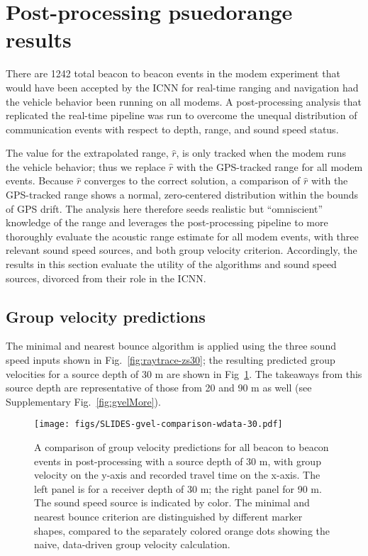 \FloatBarrier
\section{\label{sec:5} Post-processing psuedorange results}

There are 1242 total beacon to beacon events in the modem experiment that would have been accepted by the ICNN for real-time ranging and navigation had the vehicle behavior been running on all modems.
A post-processing analysis that replicated the real-time pipeline was run to overcome the unequal distribution of communication events with respect to depth, range, and sound speed status.

The value for the extrapolated range, $\hat{r}$, is only tracked when the modem runs the vehicle behavior; thus we replace $\hat{r}$ with the GPS-tracked range for all modem events.
Because $\hat{r}$ converges to the correct solution, a comparison of $\hat{r}$ with the GPS-tracked range shows a normal, zero-centered distribution within the bounds of GPS drift.
The analysis here therefore seeds realistic but ``omniscient'' knowledge of the range and leverages the post-processing pipeline to more thoroughly evaluate the acoustic range estimate for all modem events, with three relevant sound speed sources, and both group velocity criterion.
Accordingly, the results in this section evaluate the utility of the algorithms and sound speed sources, divorced from their role in the ICNN.

\FloatBarrier
\subsection{Group velocity predictions}

The minimal and nearest bounce algorithm is applied using the three sound speed inputs shown in Fig.~\ref{fig:raytrace-zs30}; the resulting predicted group velocities for a source depth of 30 m are shown in Fig~\ref{fig:gvel30}.
The takeaways from this source depth are representative of those from 20 and 90 m as well (see Supplementary Fig.~\ref{fig:gvelMore}).

\begin{figure}[h!]
\texttt{[image: figs/SLIDES-gvel-comparison-wdata-30.pdf]}
\caption{A comparison of group velocity predictions for all beacon to beacon events in post-processing with a source depth of 30 m, with group velocity on the y-axis and recorded travel time on the x-axis. The left panel is for a receiver depth of 30 m; the right panel for 90 m. The sound speed source is indicated by color. The minimal and nearest bounce criterion are distinguished by different marker shapes, compared to the separately colored orange dots showing the naive, data-driven group velocity calculation.}
\label{fig:gvel30}
\end{figure}

